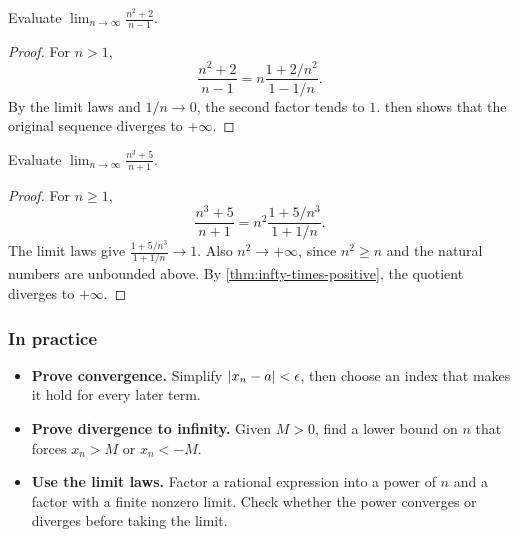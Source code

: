 \begin{example}
    Evaluate $\lim_{n\to\infty}\frac{n^2+2}{n-1}$.
\end{example}
\begin{proof}
    For $n>1$,
    \[
        \frac{n^2+2}{n-1}
        =n\frac{1+2/n^2}{1-1/n}.
    \]
    By the limit laws and $1/n\to0$, the second factor tends to $1$.  then shows that the original sequence diverges to $+\infty$.
\end{proof}

\begin{example}
    Evaluate $\lim_{n\to\infty}\frac{n^3+5}{n+1}$.
\end{example}
\begin{proof}
    For $n\geq1$,
    \[
        \frac{n^3+5}{n+1}
        =n^2\frac{1+5/n^3}{1+1/n}.
    \]
    The limit laws give $\frac{1+5/n^3}{1+1/n}\to1$. Also $n^2\to+\infty$, since $n^2\geq n$ and the natural numbers are unbounded above. By \cref{thm:infty-times-positive}, the quotient diverges to $+\infty$.
\end{proof}

\subsubsection*{In practice}
\begin{itemize}
    \item \textbf{Prove convergence.} Simplify $\left|x_n-a\right|<\epsilon$, then choose an index that makes it hold for every later term.
    \item \textbf{Prove divergence to infinity.} Given $M>0$, find a lower bound on $n$ that forces $x_n>M$ or $x_n<-M$.
    \item \textbf{Use the limit laws.} Factor a rational expression into a power of $n$ and a factor with a finite nonzero limit. Check whether the power converges or diverges before taking the limit.
\end{itemize}

